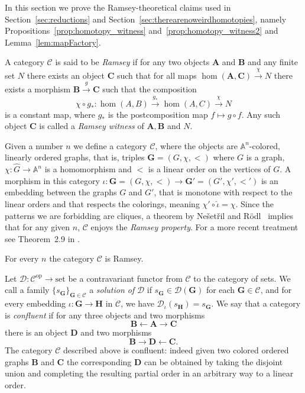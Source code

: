 \documentclass[oneside]{amsart}
\newcommand{\str}[1]{\mathbb{#1}}
\newcommand{\cat}[1]{\mathcal{#1}}
\newcommand{\op}{^{\mathrm{op}}}
\newcommand{\set}{\mathrm{set}}
\begin{document}
In this section we prove the Ramsey-theoretical claims used in Section~\ref{sec:reductions} and Section~\ref{sec:therearenoweirdhomotopies}, namely Propositions~\ref{prop:homotopy_witness} and~\ref{prop:homotopy_witness2} and Lemma~\ref{lem:mapFactory}.

\begin{definition}
    A category
    $\cat C$ is said to be \emph{Ramsey} if for any two objects $\mathbf{A}$ and $\mathbf{B}$ and any finite set $N$ there exists an object $\mathbf{C}$ such that for all maps $\hom(\mathbf{A},\mathbf{C})\xrightarrow{\chi} N$ there exists a morphism $\mathbf{B}\xrightarrow{g} \mathbf{C}$ such that the composition
    $$
   \chi\circ g_*:\hom(A,B)\xrightarrow{g_*} \hom(A,C)\xrightarrow{\chi} N
    $$
    is a constant map, where $g_*$ is the postcomposition map $f\mapsto g\circ f$. Any such object $\mathbf{C}$ is called a \emph{Ramsey witness} of $\mathbf{A},\mathbf{B}$ and $N$.
\end{definition}

Given a number $n$ we define a category $\cat C$, where the objects are $\str A^n$-colored,
linearly ordered graphs, that is, triples $\mathbf{G}=(G,\chi,<)$ where $G$ is a graph, $\chi\colon \hat G\to \str A^n$ is a homomorphism and $<$ is a linear order on the vertices of $G$. A morphism in this category $\iota\colon\mathbf{G}=(G,\chi,<)\to\mathbf{G'}=(G',\chi',<')$ is an embedding between the graphs $G$ and $G'$, that is monotone with respect to the linear orders and that respects the colorings, meaning $\chi' \circ \hat\iota = \chi$. 
Since the patterns we are forbidding are cliques, a theorem by Ne\v set\v ril and Rödl~\cite{FullNesetrilRodl1983} implies that for any given $n$, $\cat C$ enjoys the \emph{Ramsey property}. For a more recent treatment see Theorem~2.9 in \cite{Hubi_ka_2026}.

\begin{theorem}
For every $n$ the category $\cat C$
is Ramsey.
\end{theorem}
Let $\cat D \colon \cat C\op \to \set$ be a contravariant functor from $\cat C$ to the category of sets. We call a family $\{s_\mathbf{G}\}_{\mathbf{G}\in \cat C}$  a \emph{solution of} $\cat D$ if $s_\mathbf{G}\in \cat D(\mathbf{G})$ for each $\mathbf{G}\in \cat C$, and for every embedding $\iota\colon \mathbf{G} \to \mathbf{H}$ in $\cat C$, we have $\cat D_\iota(s_\mathbf{H}) = s_\mathbf{G}$. 
We say that a category is \emph{confluent} if for any three objects and two morphisms 
$$
\mathbf{B} \leftarrow\mathbf{A} \rightarrow\mathbf{C}
$$ 
there is an object $\mathbf{D}$ and two morphisms 
$$
\mathbf{B} \rightarrow \mathbf{D} \leftarrow \mathbf{C}.
$$
The category $\cat C$ described above is confluent: indeed given two colored ordered graphs $\mathbf{B}$ and $\mathbf{C}$ the corresponding $\mathbf{D}$ can be obtained by taking the disjoint union and completing the resulting partial order in an arbitrary way to a linear order.
\end{document}
